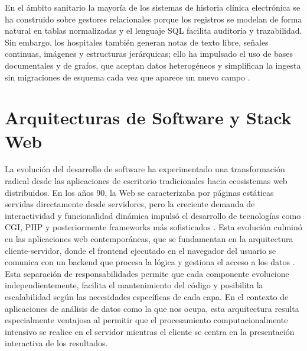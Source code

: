 En el ámbito sanitario la mayoría de los sistemas de historia clínica electrónica se ha construido sobre gestores relacionales porque los registros se modelan de forma natural en tablas normalizadas y el lenguaje SQL facilita auditoría y trazabilidad.  Sin embargo, los hospitales también generan notas de texto libre, señales continuas, imágenes y estructuras jerárquicas; ello ha impulsado el uso de bases documentales y de grafos, que aceptan datos heterogéneos y simplifican la ingesta sin migraciones de esquema cada vez que aparece un nuevo campo \cite{GAMAL2021103670,MongoFHIR}.



\section{Arquitecturas de Software y  Stack Web}

La evolución del desarrollo de software ha experimentado una transformación radical desde las aplicaciones de escritorio tradicionales hacia ecosistemas web distribuidos. En los años 90, la Web se caracterizaba por páginas estáticas servidas directamente desde servidores, pero la creciente demanda de interactividad y funcionalidad dinámica impulsó el desarrollo de tecnologías como CGI, PHP y posteriormente frameworks más sofisticados \cite{Ritesh2023_WebEvolution}. Esta evolución culminó en las aplicaciones web contemporáneas, que se fundamentan en la arquitectura cliente-servidor, donde el frontend ejecutado en el navegador del usuario se comunica con un backend que procesa la lógica y gestiona el acceso a los datos \cite{Nyabuto2024_ClientServer}. Esta separación de responsabilidades permite que cada componente evolucione independientemente, facilita el mantenimiento del código y posibilita la escalabilidad según las necesidades específicas de cada capa. En el contexto de aplicaciones de análisis de datos como la que nos ocupa, esta arquitectura resulta especialmente ventajosa al permitir que el procesamiento computacionalmente intensivo se realice en el servidor mientras el cliente se centra en la presentación interactiva de los resultados.

